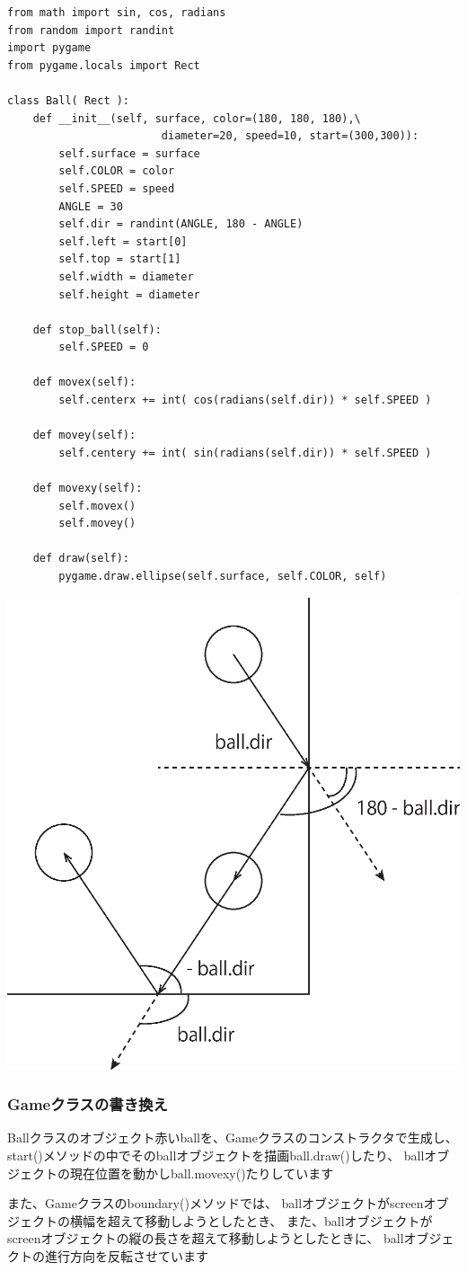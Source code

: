 \documentclass[uplatex,a4paper,11pt,oneside,openany]{jsbook}
\begin{document}
\begin{lstlisting}[caption=Ballクラス,label=p3]
from math import sin, cos, radians
from random import randint
import pygame
from pygame.locals import Rect

class Ball( Rect ):
    def __init__(self, surface, color=(180, 180, 180),\
                        diameter=20, speed=10, start=(300,300)):
        self.surface = surface
        self.COLOR = color
        self.SPEED = speed
        ANGLE = 30
        self.dir = randint(ANGLE, 180 - ANGLE)
        self.left = start[0]
        self.top = start[1]
        self.width = diameter
        self.height = diameter

    def stop_ball(self):
        self.SPEED = 0

    def movex(self):
        self.centerx += int( cos(radians(self.dir)) * self.SPEED )

    def movey(self):
        self.centery += int( sin(radians(self.dir)) * self.SPEED )

    def movexy(self):
        self.movex()
        self.movey()

    def draw(self):
        pygame.draw.ellipse(self.surface, self.COLOR, self)
\end{lstlisting}

\begin{center}
  \includegraphics[width=0.4\hsize]{figures/eps/boundball.eps}
\end{center}

\subsubsection{Gameクラスの書き換え}

Ballクラスのオブジェクト赤いballを、Gameクラスのコンストラクタで生成し、
start()メソッドの中でそのballオブジェクトを描画ball.draw()したり、
ballオブジェクトの現在位置を動かしball.movexy()たりしています

また、Gameクラスのboundary()メソッドでは、
ballオブジェクトがscreenオブジェクトの横幅を超えて移動しようとしたとき、
また、ballオブジェクトがscreenオブジェクトの縦の長さを超えて移動しようとしたときに、
ballオブジェクトの進行方向を反転させています
\end{document}
